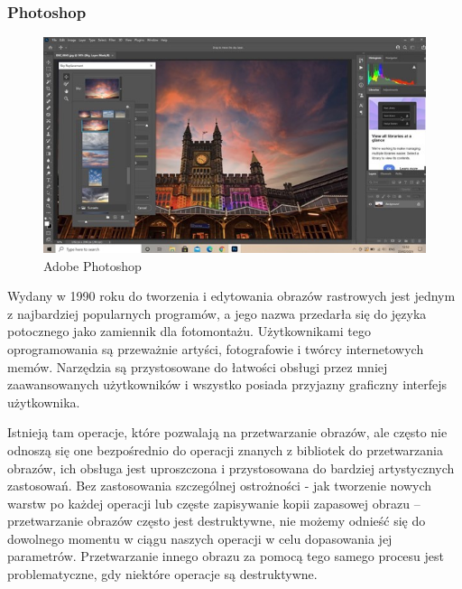 \subsubsection{Photoshop}
\begin{figure}[H]
    \centering
    \includegraphics{./images/Picture2.jpg}
    \caption{Adobe Photoshop}
    \label{fig:photoshop}
\end{figure}

Wydany w 1990 roku do tworzenia i edytowania obrazów rastrowych jest jednym z najbardziej popularnych programów, a jego nazwa przedarła się do języka potocznego jako zamiennik dla fotomontażu. 
Użytkownikami tego oprogramowania są przeważnie artyści, fotografowie i twórcy internetowych memów. 
Narzędzia są przystosowane do łatwości obsługi przez mniej zaawansowanych użytkowników i wszystko posiada przyjazny graficzny interfejs użytkownika. 

Istnieją tam operacje, które pozwalają na przetwarzanie obrazów, ale często nie odnoszą się one bezpośrednio do operacji znanych z bibliotek do przetwarzania obrazów, ich obsługa jest uproszczona i przystosowana do bardziej artystycznych zastosowań. 
Bez zastosowania szczególnej ostrożności - jak tworzenie nowych warstw po każdej operacji lub częste zapisywanie kopii zapasowej obrazu – przetwarzanie obrazów często jest destruktywne, nie możemy odnieść się do dowolnego momentu w ciągu naszych operacji w celu dopasowania jej parametrów. 
Przetwarzanie innego obrazu za pomocą tego samego procesu jest problematyczne, gdy niektóre operacje są destruktywne.

